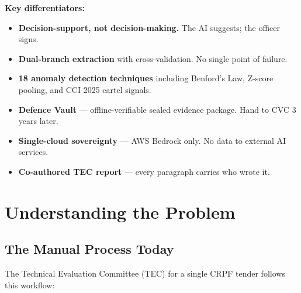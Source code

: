 \documentclass[11pt,a4paper]{article}
\begin{document}
\textbf{Key differentiators:}
\begin{itemize}[nosep]
    \item \textbf{Decision-support, not decision-making.} The AI suggests; the officer signs.
    \item \textbf{Dual-branch extraction} with cross-validation. No single point of failure.
    \item \textbf{18 anomaly detection techniques} including Benford's Law, Z-score pooling, and CCI 2025 cartel signals.
    \item \textbf{Defence Vault} — offline-verifiable sealed evidence package. Hand to CVC 3 years later.
    \item \textbf{Single-cloud sovereignty} — AWS Bedrock only. No data to external AI services.
    \item \textbf{Co-authored TEC report} — every paragraph carries who wrote it.
\end{itemize}

\section{Understanding the Problem}

\subsection{The Manual Process Today}

The Technical Evaluation Committee (TEC) for a single CRPF tender follows this workflow:
\end{document}
